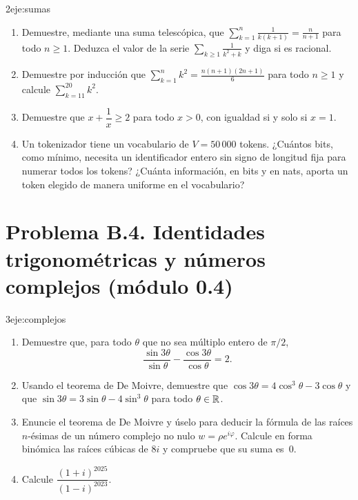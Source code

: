 \begin{ejercicio}{2}{eje:sumas}
\begin{enumerate}[label=(\alph*)]
  \item {} Demuestre, mediante una suma telescópica, que $\displaystyle\sum_{k=1}^{n}\frac{1}{k(k+1)}=\frac{n}{n+1}$ para todo $n\ge1$. Deduzca el valor de la serie $\sum_{k\ge1}\frac{1}{k^{2}+k}$ y diga si es racional.
  \item {} Demuestre por inducción que $\displaystyle\sum_{k=1}^{n}k^{2}=\frac{n(n+1)(2n+1)}{6}$ para todo $n\ge1$ y calcule $\displaystyle\sum_{k=11}^{20}k^{2}$.
  \item {} Demuestre que $x+\dfrac1x\ge2$ para todo $x>0$, con igualdad si y solo si $x=1$.
  \item {} Un tokenizador tiene un vocabulario de $V=50\,000$ tokens. ¿Cuántos bits, como mínimo, necesita un identificador entero sin signo de longitud fija para numerar todos los tokens? ¿Cuánta información, en bits y en nats, aporta un token elegido de manera uniforme en el vocabulario?
\end{enumerate}
\end{ejercicio}

\section*{Problema B.4. Identidades trigonométricas y números complejos (módulo 0.4)}

\begin{ejercicio}{3}{eje:complejos}
\begin{enumerate}[label=(\alph*)]
  \item {} Demuestre que, para todo $\theta$ que no sea múltiplo entero de $\pi/2$,
  \[
  \frac{\sin3\theta}{\sin\theta}-\frac{\cos3\theta}{\cos\theta}=2 .
  \]
  \item {} Usando el teorema de De Moivre, demuestre que $\cos3\theta=4\cos^{3}\theta-3\cos\theta$ y que $\sin3\theta=3\sin\theta-4\sin^{3}\theta$ para todo $\theta\in\mathbb{R}$.
  \item {} Enuncie el teorema de De Moivre y úselo para deducir la fórmula de las raíces $n$-ésimas de un número complejo no nulo $w=\rho e^{i\varphi}$. Calcule en forma binómica las raíces cúbicas de $8i$ y compruebe que su suma es~$0$.
  \item {} Calcule $\dfrac{(1+i)^{2025}}{(1-i)^{2023}}$.
\end{enumerate}
\end{ejercicio}

